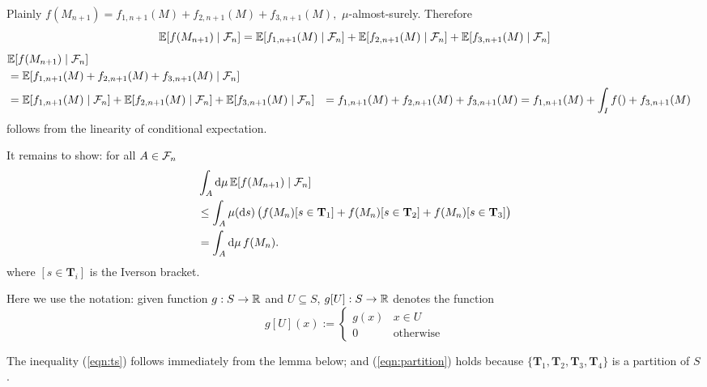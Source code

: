 Plainly
\(
f(M_{n+1}) = %
f_{1, n+1}(M) + f_{2, n+1}(M) + f_{3, n+1}(M),
\)
$\mu$-almost-surely.
Therefore 
\[
\mathbb{E}[f(M_{n+1}) \mid \mathcal{F}_n] \nonumber \\
= 
\mathbb{E}[f_{1, n+1}(M) \mid \mathcal{F}_n] + \mathbb{E}[f_{2, n+1}(M) \mid \mathcal{F}_n] + \mathbb{E}[f_{3, n+1}(M) \mid \mathcal{F}_n] 
\]
\begin{align}
& \expect{f(M_{n+1}) \mid \mathcal{F}_n} \nonumber \\
& = \expect{f_{1, n+1}(M) + f_{2, n+1}(M) + f_{3, n+1}(M)  \mid \mathcal{F}_n} 
\nonumber \\
& = \expect{f_{1, n+1}(M) \mid \mathcal{F}_n} + \expect{f_{2, n+1}(M) \mid \mathcal{F}_n} + \expect{f_{3, n+1}(M) \mid \mathcal{F}_n} 
\label{eqn:linear cond ex} 
& = f_{1, n+1}(M) + f_{2, n+1}(M) + f_{3, n+1}(M)
\label{eqn:inde cond exp}
& = f_{1, n+1}(M) + \int_I f() + f_{3, n+1}(M) \label{eqn:inde cond exp} \\
\end{align}
 follows from the linearity of conditional expectation. 

It remains to show: for all $A \in \mathcal{F}_n$
\begin{align}
& \int_A \dif \mu \, \expect{f(M_{n+1}) \mid \mathcal{F}_n} \nonumber \\
& \leq  \int_A \mu (\dif s) \, \big(f(M_{n})[s \in \mathbf{T}_1] + f(M_{n})[s \in \mathbf{T}_2] + f(M_{n})[s \in \mathbf{T}_3]\big)
\label{eqn:ts} \\
& = \int_A \dif \mu \, f(M_n). 
\label{eqn:partition} 
\end{align}
where $[s \in \mathbf{T}_i]$ is the Iverson bracket.

Here we use the notation: given function $g : S \to \mathbb{R}$ and $U \subseteq S$, $g[U] : S \to \mathbb{R}$ denotes the function
\[
g[U](x) :=
\begin{cases}
g(x) & \textrm{$x \in U$}\\
0 & \textrm{otherwise}
\end{cases}
\]

The inequality (\ref{eqn:ts}) follows immediately from the lemma below; 
and (\ref{eqn:partition}) holds because $\{\mathbf{T}_1, \mathbf{T}_2, \mathbf{T}_3, \mathbf{T}_4\}$ is a partition of $S$.
\fi

